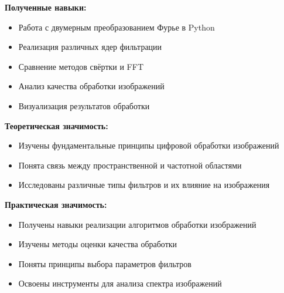\textbf{Полученные навыки:}
\begin{itemize}
    \item Работа с двумерным преобразованием Фурье в Python
    \item Реализация различных ядер фильтрации
    \item Сравнение методов свёртки и FFT
    \item Анализ качества обработки изображений
    \item Визуализация результатов обработки
\end{itemize}

\textbf{Теоретическая значимость:}
\begin{itemize}
    \item Изучены фундаментальные принципы цифровой обработки изображений
    \item Понята связь между пространственной и частотной областями
    \item Исследованы различные типы фильтров и их влияние на изображения
\end{itemize}

\textbf{Практическая значимость:}
\begin{itemize}
    \item Получены навыки реализации алгоритмов обработки изображений
    \item Изучены методы оценки качества обработки
    \item Поняты принципы выбора параметров фильтров
    \item Освоены инструменты для анализа спектра изображений
\end{itemize}
